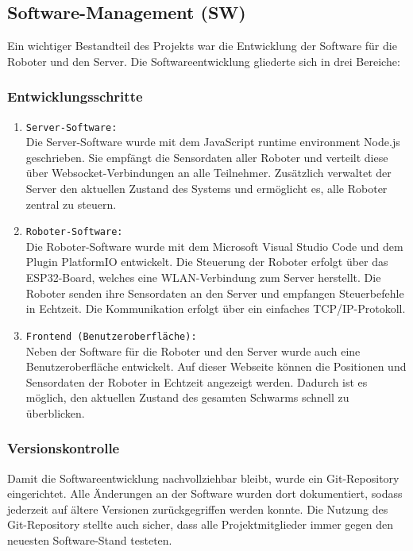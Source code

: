 \subsection{Software-Management (SW)}
%
Ein wichtiger Bestandteil des Projekts war die Entwicklung der Software für die Roboter und den Server.
Die Softwareentwicklung gliederte sich in drei Bereiche:
\subsubsection{Entwicklungsschritte}
\begin{enumerate}
    \item \texttt{Server-Software:} \\
    Die Server-Software wurde mit dem JavaScript runtime environment Node.js geschrieben. Sie empfängt die Sensordaten aller Roboter und verteilt diese über Websocket-Verbindungen an alle Teilnehmer.
    Zusätzlich verwaltet der Server den aktuellen Zustand des Systems und ermöglicht es, alle Roboter zentral zu steuern.
    \item \texttt{Roboter-Software:} \\
    Die Roboter-Software wurde mit dem Microsoft Visual Studio Code und dem Plugin PlatformIO entwickelt.
    Die Steuerung der Roboter erfolgt über das ESP32-Board, welches eine WLAN-Verbindung zum Server herstellt.
    Die Roboter senden ihre Sensordaten an den Server und empfangen Steuerbefehle in Echtzeit.
    Die Kommunikation erfolgt über ein einfaches TCP/IP-Protokoll.
    \item \texttt{Frontend (Benutzeroberfläche):} \\
    Neben der Software für die Roboter und den Server wurde auch eine Benutzeroberfläche entwickelt.
    Auf dieser Webseite können die Positionen und Sensordaten der Roboter in Echtzeit angezeigt werden.
    Dadurch ist es möglich, den aktuellen Zustand des gesamten Schwarms schnell zu überblicken.  
    \end{enumerate}

\subsubsection{Versionskontrolle}
Damit die Softwareentwicklung nachvollziehbar bleibt, wurde ein Git-Repository eingerichtet.
Alle Änderungen an der Software wurden dort dokumentiert, sodass jederzeit auf ältere Versionen zurückgegriffen werden konnte.
Die Nutzung des Git-Repository stellte auch sicher, dass alle Projektmitglieder immer gegen den neuesten Software-Stand testeten.
